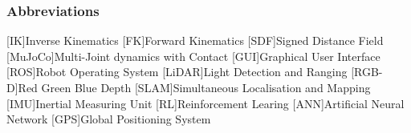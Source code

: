 \begin{Nomencl}[2.75cm]
\end{Nomencl}

\subsubsection*{Abbreviations}
    \hfill\begin{minipage}{\dimexpr\textwidth-\NomLblSep}
        \begin{acronym}[MMMMMMii]
            [IK]{Inverse Kinematics}
            [FK]{Forward Kinematics}
            [SDF]{Signed Distance Field}
            [MuJoCo]{Multi-Joint dynamics with Contact}
            [GUI]{Graphical User Interface}
            [ROS]{Robot Operating System}
            [LiDAR]{Light Detection and Ranging}
            [RGB-D]{Red Green Blue Depth}
            [SLAM]{Simultaneous Localisation and Mapping}
            [IMU]{Inertial Measuring Unit}
            [RL]{Reinforcement Learing}
            [ANN]{Artificial Neural Network}
            [GPS]{Global Positioning System}
        \end{acronym}       
    \end{minipage}
